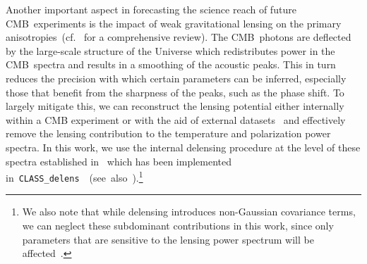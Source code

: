 Another important aspect in forecasting the science reach of future CMB~experiments is the impact of weak gravitational lensing on the primary anisotropies~(cf.~\cite{Lewis:2006fu} for a comprehensive review). The CMB~photons are deflected by the large-scale structure of the Universe which redistributes power in the CMB~spectra and results in a smoothing of the acoustic peaks. This in turn reduces the precision with which certain parameters can be inferred, especially those that benefit from the sharpness of the peaks, such as the phase shift. To largely mitigate this, we can reconstruct the lensing potential either internally within a CMB experiment or with the aid of external datasets~\cite{Okamoto:2003zw, Smith:2010gu, Larsen:2016wpa, Green:2016cjr, Sehgal:2016eag, Carron:2017vfg, ACT:2020goa, Millea:2020iuw, Hotinli:2021umk, SPT-3G:2024atg} and effectively remove the lensing contribution to the temperature and polarization power spectra. In this work, we use the internal delensing procedure at the level of these spectra established in~\cite{Green:2016cjr} which has been implemented \mbox{in \texttt{CLASS\_delens}~\cite{Hotinli:2021umk}~(see also~\cite{Trendafilova:2023xtq})}.\footnote{We also note that while delensing introduces non-Gaussian covariance terms, we can neglect these subdominant contributions in this work, since only parameters that are sensitive to the lensing power spectrum will be affected~\cite{Green:2016cjr}.}\medskip

